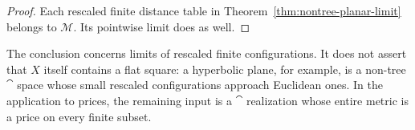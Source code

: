 \begin{proof}
Each rescaled finite distance table in
Theorem~\ref{thm:nontree-planar-limit} belongs to $\mathcal M$.
Its pointwise limit does as well.
\end{proof}

The conclusion concerns limits of rescaled finite configurations.
It does not assert that $X$ itself contains a flat square: a
hyperbolic plane, for example, is a non-tree $\cat$ space whose small
rescaled configurations approach Euclidean ones.  In the application
to prices, the remaining input is a $\cat$ realization whose entire
metric is a price on every finite subset.
